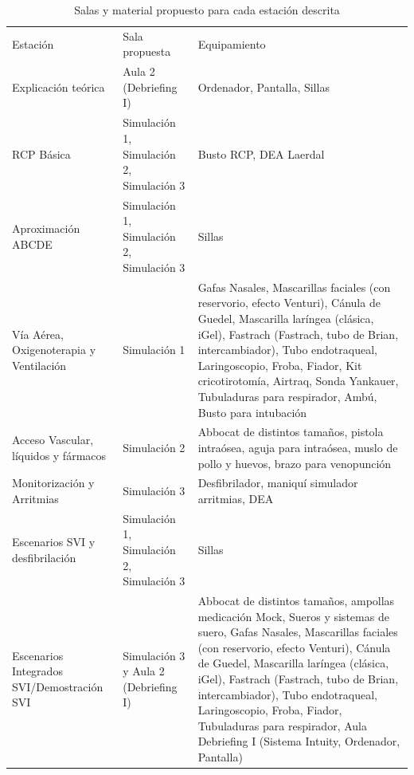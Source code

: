 \begin{table}[hptb]
    \centering
    \begin{tabular}{N{0.25\textwidth}N{0.2\textwidth}M{0.45\textwidth}}
        {\color[HTML]{FFFFFF} Estación} & {\color[HTML]{FFFFFF} Sala propuesta} & {\color[HTML]{FFFFFF} Equipamiento} \\
        Explicación teórica & Aula 2 (Debriefing I) & Ordenador, Pantalla, Sillas \\
        RCP Básica & Simulación 1, Simulación 2, Simulación 3 & Busto RCP, DEA Laerdal \\
        Aproximación ABCDE & Simulación 1, Simulación 2, Simulación 3 & Sillas \\
        Vía Aérea, Oxigenoterapia y Ventilación & Simulación 1 & Gafas Nasales, Mascarillas faciales (con reservorio, efecto Venturi), Cánula de Guedel, Mascarilla laríngea (clásica, iGel), Fastrach (Fastrach, tubo de Brian, intercambiador), Tubo endotraqueal, Laringoscopio, Froba, Fiador, Kit cricotirotomía, Airtraq, Sonda Yankauer, Tubuladuras para respirador, Ambú, Busto para intubación \\
        Acceso Vascular, líquidos y fármacos & Simulación 2 & Abbocat de distintos tamaños, pistola intraósea, aguja para intraósea, muslo de pollo y huevos, brazo para venopunción \\
        Monitorización y Arritmias & Simulación 3 & Desfibrilador, maniquí simulador arritmias, DEA \\
        Escenarios SVI y desfibrilación & Simulación 1, Simulación 2, Simulación 3 & Sillas \\
        Escenarios Integrados SVI/Demostración SVI & Simulación 3 y Aula 2 (Debriefing I) & Abbocat de distintos tamaños, ampollas medicación Mock, Sueros y sistemas de suero, Gafas Nasales, Mascarillas faciales (con reservorio, efecto Venturi), Cánula de Guedel, Mascarilla laríngea (clásica, iGel), Fastrach (Fastrach, tubo de Brian, intercambiador), Tubo endotraqueal, Laringoscopio, Froba, Fiador, Tubuladuras para respirador, Aula Debriefing I (Sistema Intuity, Ordenador, Pantalla) \\ \hline
    \end{tabular}
    \caption{Salas y material propuesto para cada estación descrita}
    \label{tab:Brusilov:SVI:SalasEstaciones}
\end{table}

